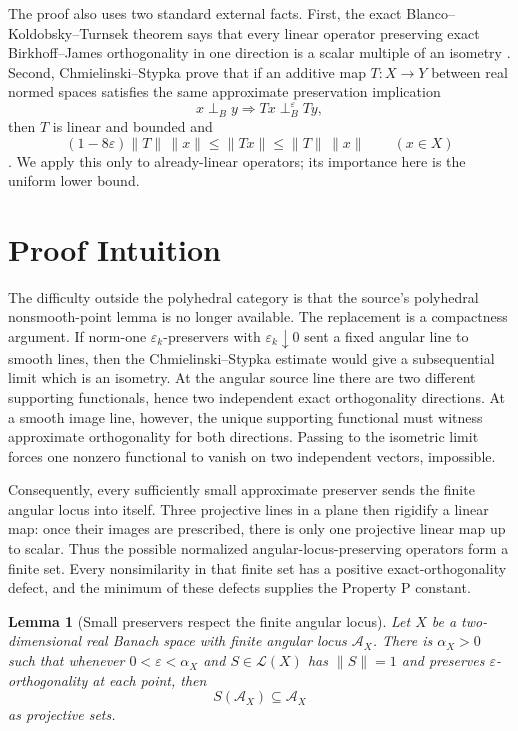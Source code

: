 \documentclass[11pt]{article}
\newtheorem{lemma}{Lemma}
\newcommand{\eps}{\varepsilon}
\newcommand{\cA}{\mathcal A}
\newcommand{\cL}{\mathcal L}
\newcommand{\perpB}{\perp_B}
\newcommand{\perpBe}{\perp_B^\varepsilon}
\begin{document}
The proof also uses two standard external facts.  First, the exact
Blanco--Koldobsky--Turnsek theorem says that every linear operator preserving
exact Birkhoff--James orthogonality in one direction is a scalar multiple of an
isometry \cite{Koldobsky,BlancoTurnsek}.  Second, Chmielinski--Stypka prove
that if an additive map \(T:X\to Y\) between real normed spaces satisfies the
same approximate preservation implication
\[
  x\perpB y\Longrightarrow Tx\perpBe Ty,
\]
then \(T\) is linear and bounded and
\[
  (1-8\eps)\|T\|\,\|x\|\leq \|Tx\|\leq \|T\|\,\|x\|
  \qquad (x\in X)
\]
\cite[Theorem 4.4]{CS}.  We apply this only to already-linear operators; its
importance here is the uniform lower bound.

\section*{Proof Intuition}

The difficulty outside the polyhedral category is that the source's
polyhedral nonsmooth-point lemma is no longer available.  The replacement is a
compactness argument.  If norm-one \(\eps_k\)-preservers with
\(\eps_k\downarrow0\) sent a fixed angular line to smooth lines, then the
Chmielinski--Stypka estimate would give a subsequential limit which is an
isometry.  At the angular source line there are two different supporting
functionals, hence two independent exact orthogonality directions.  At a smooth
image line, however, the unique supporting functional must witness approximate
orthogonality for both directions.  Passing to the isometric limit forces one
nonzero functional to vanish on two independent vectors, impossible.

Consequently, every sufficiently small approximate preserver sends the finite
angular locus into itself.  Three projective lines in a plane then rigidify a
linear map: once their images are prescribed, there is only one projective
linear map up to scalar.  Thus the possible normalized angular-locus-preserving
operators form a finite set.  Every nonsimilarity in that finite set has a
positive exact-orthogonality defect, and the minimum of these defects supplies
the Property P constant.

\begin{lemma}[Small preservers respect the finite angular locus]
\label{lem:angular-preservation}
Let \(X\) be a two-dimensional real Banach space with finite angular locus
\(\cA_X\).  There is \(\alpha_X>0\) such that whenever \(0<\eps<\alpha_X\)
and \(S\in\cL(X)\) has \(\|S\|=1\) and preserves \(\eps\)-orthogonality at
each point, then
\[
  S(\cA_X)\subseteq \cA_X
\]
as projective sets.
\end{lemma}
\end{document}
